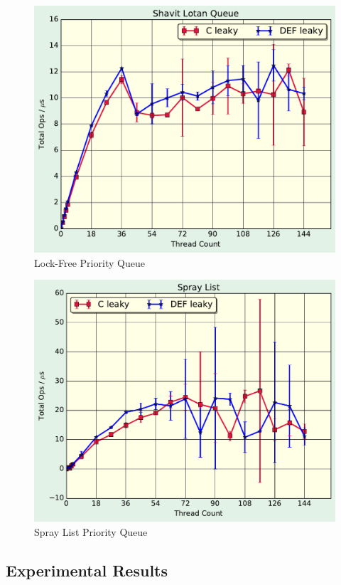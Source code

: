 \begin{figure}
\includegraphics[scale=.4]{gfx/ShavitLotanQueue.pdf}
\caption{Lock-Free Priority Queue}
\end{figure}

\begin{figure}
\includegraphics[scale=.4]{gfx/SprayList.pdf}
\caption{Spray List Priority Queue}
\end{figure}

\subsection{Experimental Results}
